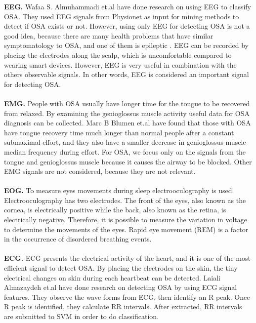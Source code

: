     \textbf{EEG. } Wafaa S. Almuhammadi et.al\citep{IEEEOSAEEG} have done research on using EEG to classify OSA. They used EEG signals from Physionet as input for mining methods to detect if OSA exists or not. However, using only EEG for detecting OSA is not a good idea, because there are many health problems that have similar symptomatology to OSA, and one of them is epileptic \citep{NCBIEGEPILEPSY}. EEG can be recorded by placing the electrodes along the scalp, which is uncomfortable compared to wearing smart devices. However, EEG is very useful in combination with the others observable signals. In other words, EEG is considered an important signal for detecting OSA.\\\\
    \textbf{EMG. }People with OSA usually have longer time for the tongue to be recovered from relaxed. By examining the genioglossus muscle activity useful data for OSA diagnosis can be collected. Marc B Blumen et.al \citep{SDEMG} have found that those with OSA have tongue recovery time much longer than normal people after a constant submaximal effort, and they also have a smaller decrease in genioglossus muscle median frequency during effort. For OSA, we focus only on the signals from the tongue and genioglossus muscle because it causes the airway to be blocked. Other EMG signals are not considered, because they are not relevant.\\\\
    \textbf{EOG. }To measure eyes movements during sleep electrooculography is used. Electrooculography has two electrodes. The front of the eyes, also known as the cornea, is electrically positive while the back, also known as the retina, is electrically negative. Therefore, it is possible to measure the variation in voltage to determine the movements of the eyes. Rapid eye movement (REM) is a factor in the occurrence of disordered breathing events\citep{JSREM}. \\\\
    \textbf{ECG. } ECG presents the electrical activity of the heart, and it is one of the most efficient signal to detect OSA. By placing the electrodes on the skin, the tiny electrical changes on skin during each heartbeat can be detected. Laiali Almazaydeh et.al \citep{RESEARCHGATE} have done research on detecting OSA by using ECG signal features. They observe the wave forms from ECG, then identify an R peak. Once R peak is identified, they calculate RR intervals. After extracted, RR intervals are submitted to SVM in order to do classification.\\\\
